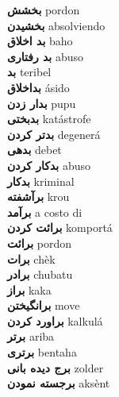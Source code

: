 \textbf{ بخشش  } pordon \\
\textbf{ بخشیدن  } absolviendo \\
\textbf{ بد اخلاق  } baho \\
\textbf{ بد رفتاری  } abuso \\
\textbf{ بد  } teribel \\
\textbf{ بداخلاق  } ásido \\
\textbf{ بدار زدن  } pupu \\
\textbf{ بدبختی  } katástrofe \\
\textbf{ بدتر کردن  } degenerá \\
\textbf{ بدهی  } debet \\
\textbf{ بدکار کردن  } abuso \\
\textbf{ بدکار  } kriminal \\
\textbf{ برآشفته  } krou \\
\textbf{ برآمد  } a costo di \\
\textbf{ برائت کردن  } komportá \\
\textbf{ برائت  } pordon \\
\textbf{ برات  } chèk \\
\textbf{ برادر  } chubatu \\
\textbf{ براز  } kaka \\
\textbf{ برانگیختن  } move \\
\textbf{ براورد کردن  } kalkulá \\
\textbf{ برتر  } ariba \\
\textbf{ برتری  } bentaha \\
\textbf{ برج دیده بانی  } zolder \\
\textbf{ برجسته نمودن  } aksènt \\
